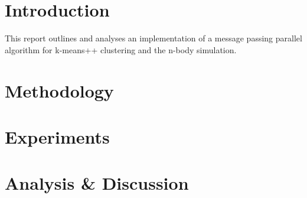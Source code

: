\documentclass{article}
\newcommand{\n}{\ \-}
\begin{document}
\section*{Introduction}
This report outlines and analyses an implementation of a message passing parallel algorithm for
k-means++ clustering and the n-body simulation.\n





\section*{Methodology}

\section*{Experiments}

\section*{Analysis \& Discussion}
\end{document}
